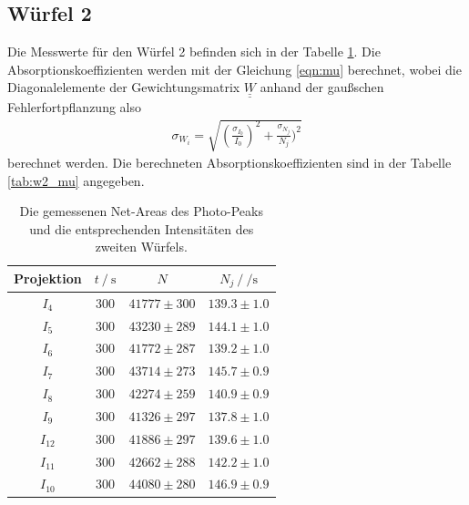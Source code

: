 \subsection{Würfel 2}
Die Messwerte für den Würfel 2 befinden sich in der Tabelle \ref{tab:w2}. 
Die Absorptionskoeffizienten werden mit der Gleichung \ref{eqn:mu} berechnet, wobei die Diagonalelemente der Gewichtungsmatrix $\underline{\underline{W}}$ 
anhand der gaußschen Fehlerfortpflanzung also 
\begin{align}
  \sigma_{W_i} = \sqrt{(\frac{\sigma_{I_0}}{I_0})^2 + \frac{\sigma_{N_j}}{N_j})^2}
\end{align}
berechnet werden. Die berechneten Absorptionskoeffizienten sind in der Tabelle \ref{tab:w2_mu} angegeben. 
\begin{table}[H]
  \centering
  \begin{tabular}{c c c c}
    \toprule
     Projektion &  $t \:/\: \si{\second}$ &     $N$ &           $N_j \:/\: \si{\per\second}$ \\
    \midrule
            $I_{  4}$ &   $300$ & $41777 \pm    300$ & $139.3\pm1.0$ \\
            $I_{  5}$ &   $300$ & $43230 \pm    289$ & $144.1\pm1.0$ \\
            $I_{  6}$ &   $300$ & $41772 \pm    287$ & $139.2\pm1.0$ \\
            $I_{  7}$ &   $300$ & $43714 \pm    273$ & $145.7\pm0.9$ \\
            $I_{  8}$ &   $300$ & $42274 \pm    259$ & $140.9\pm0.9$ \\
            $I_{  9}$ &   $300$ & $41326 \pm    297$ & $137.8\pm1.0$ \\
            $I_{ 12}$ &   $300$ & $41886 \pm    297$ & $139.6\pm1.0$ \\
            $I_{ 11}$ &   $300$ & $42662 \pm    288$ & $142.2\pm1.0$ \\
            $I_{ 10}$ &   $300$ & $44080 \pm    280$ & $146.9\pm0.9$ \\
    \bottomrule
    \end{tabular}
  \caption{Die gemessenen Net-Areas des Photo-Peaks und die entsprechenden Intensitäten des zweiten Würfels. }
  \label{tab:w2}
\end{table}

